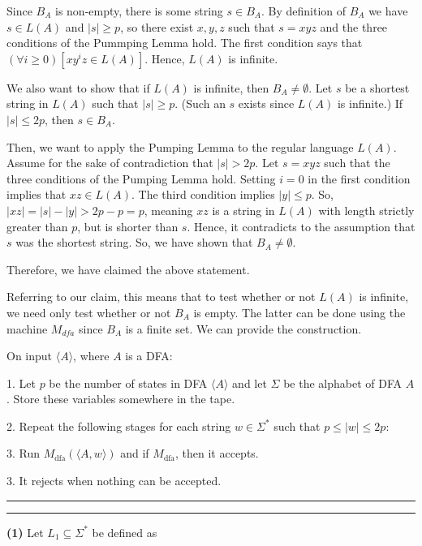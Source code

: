 \documentclass[a4paper, 11pt]{article}
\newcommand{\question}[2] {\vspace{.25in} \hrule\vspace{0.5em}
	\noindent{\bf #1: #2} \vspace{0.5em}
	\hrule \vspace{.10in}}
\renewcommand{\part}[1] {\vspace{.10in} {\bf (#1)}}
\newcommand\tab[1][1cm]{\hspace*{#1}}
\begin{document}
	Since $B_A$ is non-empty, there is some string $s \in B_A$. By definition of $B_A$ we have $s \in L(A)$ and $|s| \geq p$, so there exist $x,y,z$ such that $s = xyz$ and the three conditions of the Pummping Lemma hold. The first condition says that $(\forall i \geq 0)[xy^iz \in L(A)]$. Hence, $L(A)$ is infinite.
	
	We also want to show that if $L(A)$ is infinite, then $B_A \neq \emptyset$. Let $s$ be a shortest string in $L(A)$ such that $|s| \geq p$. (Such an $s$ exists since $L(A)$ is infinite.) If $|s| \leq 2p$, then $s \in B_A$. 
	
	Then, we want to apply the Pumping Lemma to the regular language $L(A)$. Assume for the sake of contradiction that $|s| > 2p$. Let $s = xyz$ such that the three conditions of the Pumping Lemma hold. Setting $i = 0$ in the first condition implies that $xz \in L(A)$. The third condition implies $|y| \leq p$. So, $|xz| = |s| - |y| > 2p - p = p$, meaning $xz$ is a string in $L(A)$ with length strictly greater than $p$, but is shorter than $s$. Hence, it contradicts to the assumption that $s$ was the shortest string. So, we have shown that $B_A \neq \emptyset$. 
	
	Therefore, we have claimed the above statement.
	
	Referring to our claim, this means that to test whether or not $L(A)$ is infinite, we need only test whether or not $B_A$ is empty. The latter can be done using the machine $M_{dfa}$ since $B_A$ is a finite set. We can provide the construction. 
	
	On input $\langle A \rangle$, where $A$ is a DFA:
	
	1. Let $p$ be the number of states in DFA $\langle A \rangle$ and let $\Sigma$ be the alphabet of DFA $A$. Store these variables somewhere in the tape.
	
	2. Repeat the following stages for each string $w \in \Sigma^*$ such that $p \leq |w| \leq 2p$:
	
	\tab	3. Run $M_{\text{dfa}}(\langle A, w \rangle)$ and if $M_{\text{dfa}}$, then it accepts.
	
	3. It rejects when nothing can be accepted.
	
	
	\question{6}{Lucky 9}
	
	\part{1} Let $L_1 \subseteq \Sigma^*$ be defined as
	
\end{document}
